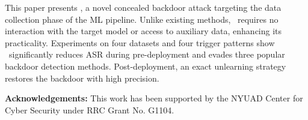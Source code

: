 This paper presents \methodname, a novel concealed backdoor attack targeting the data collection phase of the ML pipeline. Unlike existing methods, \methodname~requires no interaction with the target model or access to auxiliary data, enhancing its practicality. Experiments on four datasets and four trigger patterns show \methodname~significantly reduces ASR during pre-deployment and evades three popular backdoor detection methods. Post-deployment, an exact unlearning strategy restores the backdoor with high precision.

\vspace{0.15cm}
\noindent \textbf{Acknowledgements:} This work has been supported by the NYUAD Center for Cyber Security under RRC Grant No. G1104.